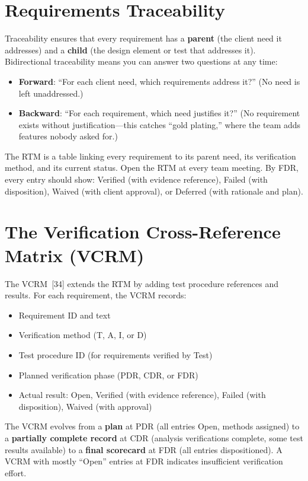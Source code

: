 \section{Requirements Traceability}
Traceability ensures that every requirement has a \textbf{parent} (the client need it addresses) and a \textbf{child} (the design element or test that addresses it). Bidirectional traceability means you can answer two questions at any time:
\begin{itemize}[nosep,leftmargin=1.5em]
\item \textbf{Forward}: ``For each client need, which requirements address it?'' (No need is left unaddressed.)
\item \textbf{Backward}: ``For each requirement, which need justifies it?'' (No requirement exists without justification---this catches ``gold plating,'' where the team adds features nobody asked for.)
\end{itemize}

The RTM is a table linking every requirement to its parent need, its verification method, and its current status. Open the RTM at every team meeting. By FDR, every entry should show: Verified (with evidence reference), Failed (with disposition), Waived (with client approval), or Deferred (with rationale and plan).

\section{The Verification Cross-Reference Matrix (VCRM)}
The VCRM~[34] extends the RTM by adding test procedure references and results. For each requirement, the VCRM records:
\begin{itemize}[nosep,leftmargin=1.5em]
\item Requirement ID and text
\item Verification method (T, A, I, or D)
\item Test procedure ID (for requirements verified by Test)
\item Planned verification phase (PDR, CDR, or FDR)
\item Actual result: Open, Verified (with evidence reference), Failed (with disposition), Waived (with approval)
\end{itemize}

The VCRM evolves from a \textbf{plan} at PDR (all entries Open, methods assigned) to a \textbf{partially complete record} at CDR (analysis verifications complete, some test results available) to a \textbf{final scorecard} at FDR (all entries dispositioned). A VCRM with mostly ``Open'' entries at FDR indicates insufficient verification effort.

